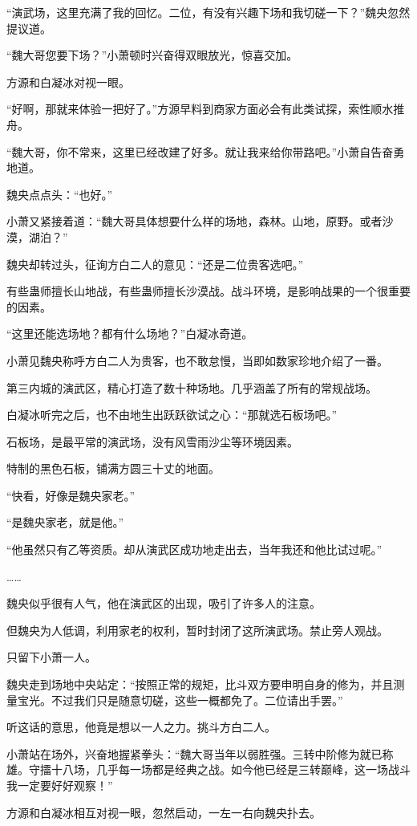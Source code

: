 \begin{this_body}
“演武场，这里充满了我的回忆。二位，有没有兴趣下场和我切磋一下？”魏央忽然提议道。

“魏大哥您要下场？”小萧顿时兴奋得双眼放光，惊喜交加。

方源和白凝冰对视一眼。

“好啊，那就来体验一把好了。”方源早料到商家方面必会有此类试探，索性顺水推舟。

“魏大哥，你不常来，这里已经改建了好多。就让我来给你带路吧。”小萧自告奋勇地道。

魏央点点头：“也好。”

小萧又紧接着道：“魏大哥具体想要什么样的场地，森林。山地，原野。或者沙漠，湖泊？”

魏央却转过头，征询方白二人的意见：“还是二位贵客选吧。”

有些蛊师擅长山地战，有些蛊师擅长沙漠战。战斗环境，是影响战果的一个很重要的因素。

“这里还能选场地？都有什么场地？”白凝冰奇道。

小萧见魏央称呼方白二人为贵客，也不敢怠慢，当即如数家珍地介绍了一番。

第三内城的演武区，精心打造了数十种场地。几乎涵盖了所有的常规战场。

白凝冰听完之后，也不由地生出跃跃欲试之心：“那就选石板场吧。”

石板场，是最平常的演武场，没有风雪雨沙尘等环境因素。

特制的黑色石板，铺满方圆三十丈的地面。

“快看，好像是魏央家老。”

“是魏央家老，就是他。”

“他虽然只有乙等资质。却从演武区成功地走出去，当年我还和他比试过呢。”

……

魏央似乎很有人气，他在演武区的出现，吸引了许多人的注意。

但魏央为人低调，利用家老的权利，暂时封闭了这所演武场。禁止旁人观战。

只留下小萧一人。

魏央走到场地中央站定：“按照正常的规矩，比斗双方要申明自身的修为，并且测量宝光。不过我们只是随意切磋，这些一概都免了。二位请出手罢。”

听这话的意思，他竟是想以一人之力。挑斗方白二人。

小萧站在场外，兴奋地握紧拳头：“魏大哥当年以弱胜强。三转中阶修为就已称雄。守擂十八场，几乎每一场都是经典之战。如今他已经是三转巅峰，这一场战斗我一定要好好观察！”

方源和白凝冰相互对视一眼，忽然启动，一左一右向魏央扑去。


\end{this_body}
